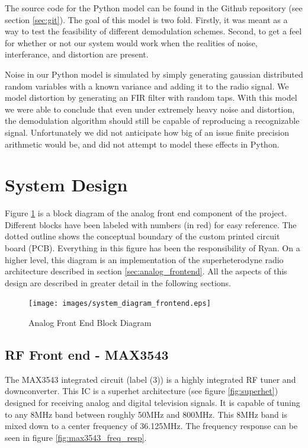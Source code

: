 \documentclass[a4paper, 12pt, notitlepage]{article}
\begin{document}
The source code for the Python model can be found in the Github repository (see section \ref{sec:git}).  The goal of this model is two fold.  Firstly, it was meant as a way to test the feasibility of different demodulation schemes.  Second, to get a feel for whether or not our system would work when the realities of noise, interferance, and distortion are present.

Noise in our Python model is simulated by simply generating gaussian distributed random variables with a known variance and adding it to the radio signal.  We model distortion by generating an FIR filter with random taps.  With this model we were able to conclude that even under extremely heavy noise and distortion, the demodulation algorithm should still be capable of reproducing a recognizable signal.  Unfortunately we did not anticipate how big of an issue finite precision arithmetic would be, and did not attempt to model these effects in Python.

\section{System Design}
Figure \ref{fig:analog_block_diagram} is a block diagram of the analog front end component of the project.  Different blocks have been labeled with numbers (in red) for easy reference.  The dotted outline shows the conceptual boundary of the custom printed circuit board (PCB).  Everything in this figure has been the responsibility of Ryan.  On a higher level, this diagram is an implementation of the superheterodyne radio architecture described in section \ref{sec:analog_frontend}.  All the aspects of this design are described in greater detail in the following sections.

\begin{figure}
  \centering
  \caption{Analog Front End Block Diagram}
  \label{fig:analog_block_diagram}
  \texttt{[image: images/system\_diagram\_frontend.eps]}
\end{figure}

\subsection{RF Front end - MAX3543}
The MAX3543 integrated circuit \cite{max3543} (label (3)) is a highly integrated RF tuner and downconverter.  This IC is a superhet architecture (see figure \ref{fig:superhet}) designed for receiving analog and digital television signals.  It is capable of tuning to any 8MHz band between roughly 50MHz and 800MHz.  This 8MHz band is mixed down to a center frequency of 36.125MHz.  The frequency response can be seen in figure \ref{fig:max3543_freq_resp}.
\end{document}
